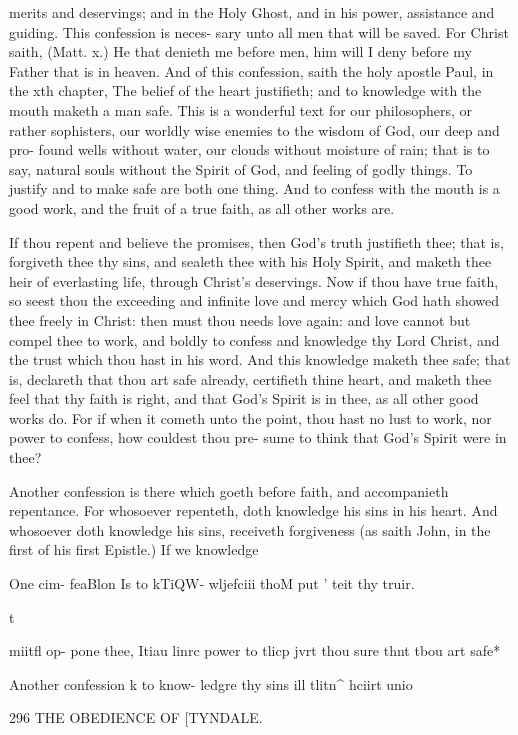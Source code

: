 \documentclass{custom}
\begin{document}
{{merits and deservings; and in the Holy Ghost, and in his 
power, assistance and guiding. This confession is neces- 
sary unto all men that will be saved. For Christ saith, 
(Matt. x.) He that denieth me before men, him will I 
deny before my Father that is in heaven. And of this 
confession, saith the holy apostle Paul, in the xth chapter, 
The belief of the heart justifieth; and to knowledge with 
the mouth maketh a man safe. This is a wonderful text 
for our philosophers, or rather sophisters, our worldly 
wise enemies to the wisdom of God, our deep and pro- 
found wells without water, our clouds without moisture of 
rain; that is to say, natural souls without the Spirit of 
God, and feeling of godly things. To justify and to 
make safe are both one thing. And to confess with the 
mouth is a good work, and the fruit of a true faith, as all 
other works are. 

If thou repent and believe the promises, then God's 
truth justifieth thee; that is, forgiveth thee thy sins, and 
sealeth thee with his Holy Spirit, and maketh thee heir of 
everlasting life, through Christ's deservings. Now if thou 
have true faith, so seest thou the exceeding and infinite 
love and mercy which God hath showed thee freely in 
Christ: then must thou needs love again: and love 
cannot but compel thee to work, and boldly to confess and 
knowledge thy Lord Christ, and the trust which thou 
hast in his word. And this knowledge maketh thee safe; 
that is, declareth that thou art safe already, certifieth thine 
heart, and maketh thee feel that thy faith is right, and 
that God's Spirit is in thee, as all other good works do. 
For if when it cometh unto the point, thou hast no lust 
to work, nor power to confess, how couldest thou pre- 
sume to think that God's Spirit were in thee? 

Another confession is there which goeth before faith, 
and accompanieth repentance. For whosoever repenteth, 
doth knowledge his sins in his heart. And whosoever 
doth knowledge his sins, receiveth forgiveness (as saith 
John, in the first of his first Epistle.) If we knowledge 

One cim- 
feaBlon Is 
to kTiQW- 
wljefciii 
thoM put ' 
teit thy 
truir. 

t} miitfl op- 
pone thee, 
Itiau linrc 
power to 
tlicp jvrt 
thou sure 
thnt tbou 
art safe* 

Another 
confession 
k to know- 
ledgre thy 
sins ill tlitn^ 
hciirt unio 


296 THE OBEDIENCE OF [TYNDALE.

}
\end{document}
